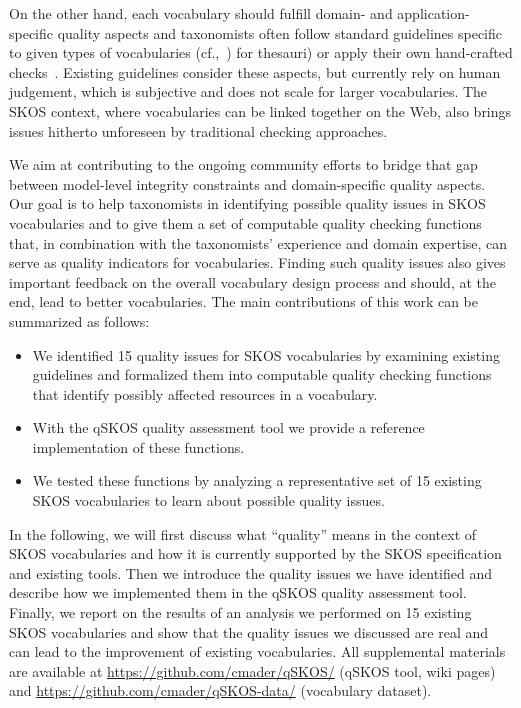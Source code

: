 On the other hand, each vocabulary should fulfill domain- and application-specific quality aspects and taxonomists often follow standard guidelines specific to given types of vocabularies (cf.,~\cite{ISO25964-1:2011,Z39.19:2005}) for thesauri) or apply their own hand-crafted checks~\cite{Coronado2009}. Existing guidelines consider these aspects, but currently rely on human judgement, which is subjective and does not scale for larger vocabularies. The SKOS context, where vocabularies can be linked together on the Web, also brings issues hitherto unforeseen by traditional checking approaches.


We aim at contributing to the ongoing community efforts to bridge that gap between model-level integrity constraints and domain-specific quality aspects. Our goal is to help taxonomists in identifying possible quality issues in SKOS vocabularies and to give them a set of computable quality checking functions that, in combination with the taxonomists' experience and domain expertise, can serve as quality indicators for vocabularies. Finding such quality issues also gives important feedback on the overall vocabulary design process and should, at the end, lead to better vocabularies. The main contributions of this work can be summarized as follows:

\begin{itemize}

	\item We identified 15 quality issues for SKOS vocabularies by examining existing guidelines and formalized them into computable quality checking functions that identify possibly affected resources in a vocabulary.
	
	\item With the qSKOS quality assessment tool we provide a reference implementation of these functions.

	\item We tested these functions by analyzing a representative set of 15 existing SKOS vocabularies to learn about possible quality issues.

\end{itemize}

In the following, we will first discuss what ``quality'' means in the context of SKOS vocabularies and how it is currently supported by the SKOS specification and existing tools. Then we introduce the quality issues we have identified and describe how we implemented them in the qSKOS quality assessment tool. Finally, we report on the results of an analysis we performed on 15 existing SKOS vocabularies and show that the quality issues we discussed are real and can lead to the improvement of existing vocabularies. All supplemental materials are available at \url{https://github.com/cmader/qSKOS/} (qSKOS tool, wiki pages) and \url{https://github.com/cmader/qSKOS-data/} (vocabulary dataset).